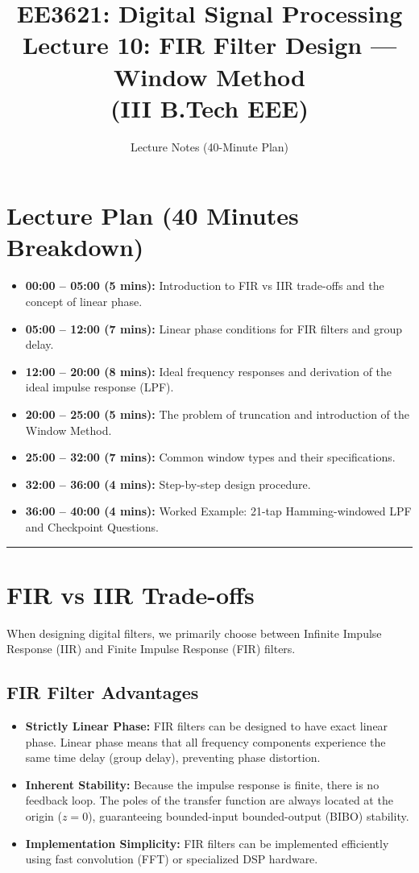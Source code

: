 \documentclass[11pt,a4paper]{article}
\title{\textbf{EE3621: Digital Signal Processing} \\ \Large Lecture 10: FIR Filter Design — Window Method \\ \large (III B.Tech EEE)}
\author{Lecture Notes (40-Minute Plan)}
\date{}
\begin{document}
\maketitle

\section{Lecture Plan (40 Minutes Breakdown)}
\begin{itemize}
    \item \textbf{00:00 -- 05:00 (5 mins):} Introduction to FIR vs IIR trade-offs and the concept of linear phase.
    \item \textbf{05:00 -- 12:00 (7 mins):} Linear phase conditions for FIR filters and group delay.
    \item \textbf{12:00 -- 20:00 (8 mins):} Ideal frequency responses and derivation of the ideal impulse response (LPF).
    \item \textbf{20:00 -- 25:00 (5 mins):} The problem of truncation and introduction of the Window Method.
    \item \textbf{25:00 -- 32:00 (7 mins):} Common window types and their specifications.
    \item \textbf{32:00 -- 36:00 (4 mins):} Step-by-step design procedure.
    \item \textbf{36:00 -- 40:00 (4 mins):} Worked Example: 21-tap Hamming-windowed LPF and Checkpoint Questions.
\end{itemize}

\noindent\rule{\textwidth}{0.5pt}

\section{FIR vs IIR Trade-offs}
When designing digital filters, we primarily choose between Infinite Impulse Response (IIR) and Finite Impulse Response (FIR) filters.

\subsection{FIR Filter Advantages}
\begin{itemize}
    \item \textbf{Strictly Linear Phase:} FIR filters can be designed to have exact linear phase. Linear phase means that all frequency components experience the same time delay (group delay), preventing phase distortion.
    \item \textbf{Inherent Stability:} Because the impulse response is finite, there is no feedback loop. The poles of the transfer function are always located at the origin ($z=0$), guaranteeing bounded-input bounded-output (BIBO) stability.
    \item \textbf{Implementation Simplicity:} FIR filters can be implemented efficiently using fast convolution (FFT) or specialized DSP hardware.
\end{itemize}
\end{document}
